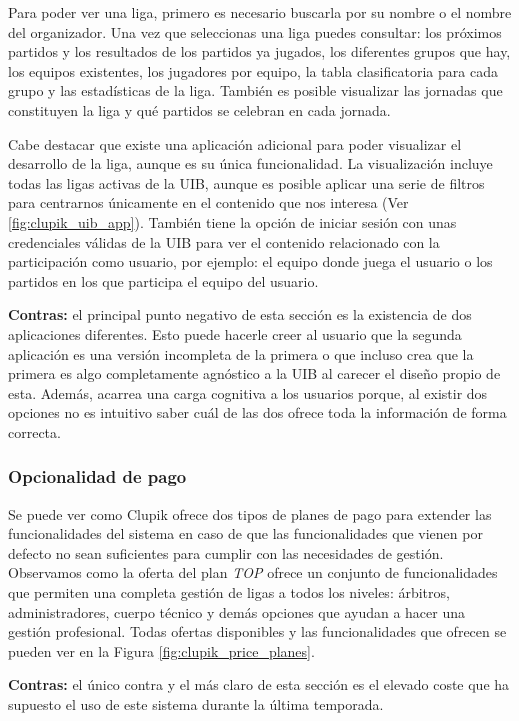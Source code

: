 Para poder ver una liga, primero es necesario buscarla por su nombre o el nombre del organizador. Una vez que seleccionas una liga puedes consultar: los próximos partidos y los resultados de los partidos ya jugados, los diferentes grupos que hay, los equipos existentes, los jugadores por equipo, la tabla clasificatoria para cada grupo y las estadísticas de la liga. También es posible visualizar las jornadas que constituyen la liga y qué partidos se celebran en cada jornada.

Cabe destacar que existe una aplicación adicional para poder visualizar el desarrollo de la liga, aunque es su única funcionalidad. La visualización incluye todas las ligas activas de la \ac{UIB}, aunque es posible aplicar una serie de filtros para centrarnos únicamente en el contenido que nos interesa (Ver \ref{fig:clupik_uib_app}). También tiene la opción de iniciar sesión con unas credenciales válidas de la \ac{UIB} para ver el contenido relacionado con la participación como usuario, por ejemplo: el equipo donde juega el usuario o los partidos en los que participa el equipo del usuario.

\textbf{Contras:} el principal punto negativo de esta sección es la existencia de dos aplicaciones diferentes. Esto puede hacerle creer al usuario que la segunda aplicación es una versión incompleta de la primera o que incluso crea que la primera es algo completamente agnóstico a la \ac{UIB} al carecer el diseño propio de esta. Además, acarrea una carga cognitiva a los usuarios porque, al existir dos opciones no es intuitivo saber cuál de las dos ofrece toda la información de forma correcta.

\subsubsection*{Opcionalidad de pago}

Se puede ver como Clupik ofrece dos tipos de planes de pago para extender las funcionalidades del sistema en caso de que las funcionalidades que vienen por defecto no sean suficientes para cumplir con las necesidades de gestión. Observamos como la oferta del plan \emph{TOP} ofrece un conjunto de funcionalidades que permiten una completa gestión de ligas a todos los niveles: árbitros, administradores, cuerpo técnico y demás opciones que ayudan a hacer una gestión profesional. Todas ofertas disponibles y las funcionalidades que ofrecen se pueden ver en la Figura \ref{fig:clupik_price_planes}.

\textbf{Contras:} el único contra y el más claro de esta sección es el elevado coste que ha supuesto el uso de este sistema durante la última temporada.

